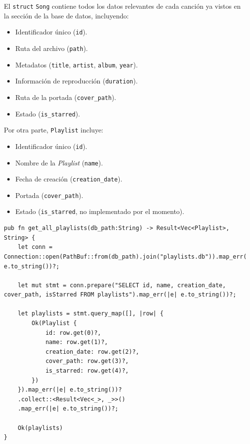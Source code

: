 \documentclass[11pt, a4paper]{article}
\begin{document}
            El \verb|struct| \verb|Song| contiene todos los datos relevantes de cada canción ya vistos en la sección de la base de datos, incluyendo:

            \begin{itemize}
              \item Identificador único (\verb|id|).
              \item Ruta del archivo (\verb|path|).
              \item Metadatos (\verb|title|, \verb|artist|, \verb|album|, \verb|year|).
              \item Información de reproducción (\verb|duration|).
              \item Ruta de la portada (\verb|cover_path|).
              \item Estado (\verb|is_starred|).
            \end{itemize}

            Por otra parte, \verb|Playlist| incluye:

            \begin{itemize}
              \item Identificador único (\verb|id|).
              \item Nombre de la \textit{Playlist} (\verb|name|).
              \item Fecha de creación (\verb|creation_date|).
              \item Portada (\verb|cover_path|).
              \item Estado (\verb|is_starred|, no implementado por el momento).
            \end{itemize}

            \begin{lstlisting}[caption={fn get\_all\_playlists()}]
pub fn get_all_playlists(db_path:String) -> Result<Vec<Playlist>, String> {
    let conn = Connection::open(PathBuf::from(db_path).join("playlists.db")).map_err(|e| e.to_string())?;

    let mut stmt = conn.prepare("SELECT id, name, creation_date, cover_path, isStarred FROM playlists").map_err(|e| e.to_string())?;

    let playlists = stmt.query_map([], |row| {
        Ok(Playlist {
            id: row.get(0)?,
            name: row.get(1)?,
            creation_date: row.get(2)?,
            cover_path: row.get(3)?,
            is_starred: row.get(4)?,
        })
    }).map_err(|e| e.to_string())?
    .collect::<Result<Vec<_>, _>>()
    .map_err(|e| e.to_string())?;

    Ok(playlists)
}
            \end{lstlisting}
\end{document}
